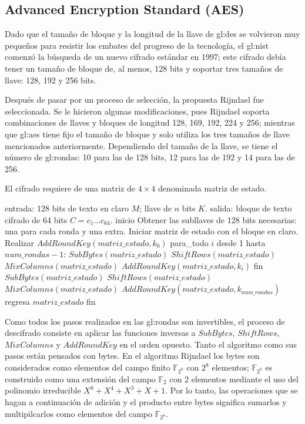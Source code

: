 %
%

\subsection{Advanced Encryption Standard (AES)}
\label{sec:aes}

Dado que el tamaño de bloque y la longitud de la llave de \acrshort{gl:des}
se volvieron muy pequeños para resistir los embates del progreso
de la tecnología, el \acrshort{gl:nist} comenzó la búsqueda de un nuevo cifrado
estándar en 1997; este cifrado debía tener un tamaño de bloque de,
al menos, 128 bits y soportar tres tamaños de llave: 128, 192 y 256 bits.

Después de pasar por un proceso de selección, la propuesta Rijndael fue
seleccionada. Se le hicieron algunas modificaciones, pues Rijndael soporta
combinaciones de llaves y bloques de longitud 128, 169, 192, 224 y 256;
mientras que \acrshort{gl:aes} tiene fijo el tamaño de bloque y solo utiliza
los tres tamaños de llave mencionados anteriormente. Dependiendo del tamaño
de la llave, se tiene el número de \glspl{gl:ronda}: 10 para las de 128 bits,
12 para las de 192 y 14 para las de 256.

El cifrado requiere de una matriz de $4 \times 4$ denominada matriz de
estado.

\begin{pseudocodigo}[caption={AES, cifrado.}, label={aes:1}]
  entrada:    128 bits de texto en claro $M$; llave de $n$ bits $K$.
  salida:     bloque de texto cifrado de 64 bits $C = c_1 \dots c_{64}$.
  inicio
    Obtener las subllaves de 128 bits necesarias: una para cada ronda y una extra.
    Iniciar matriz de estado con el bloque en claro.
    Realizar $AddRoundKey(matriz\_estado, k_0)$
    para_todo $i$ desde 1 hasta $num\_rondas-1$:
      $SubBytes(matriz\_estado)$
      $ShiftRows(matriz\_estado)$
      $MixColumns(matriz\_estado)$
      $AddRoundKey(matriz\_estado, k_i)$
    fin
    $SubBytes(matriz\_estado)$
    $ShiftRows(matriz\_estado)$
    $MixColumns(matriz\_estado)$
    $AddRoundKey(matriz\_estado, k_{num\_rondas})$
    regresa $matriz\_estado$
  fin
\end{pseudocodigo}

Como todos los pasos realizados en las \glspl{gl:ronda} son invertibles, el
proceso de descifrado consiste en aplicar las funciones inversas a
$SubBytes$, $ShiftRows$, $MixColumns$ y $AddRoundKey$ en el orden
opuesto. Tanto el algoritmo como sus pasos están pensados con bytes. 
En el algoritmo Rijndael los bytes son considerados como elementos del
campo finito $\mathbb{F}_{2^8}$ con ${2^8}$ elementos; $\mathbb{F}_{2^8}$
es construido como una extensión del campo  $\mathbb{F}_{2}$ con 2 elementos
mediante el uso del polinomio irreducible $X^8+X^4+X^3+X+1$.
Por lo tanto, las operaciones que se hagan a continuación de adición y el
producto entre bytes significa sumarlos y multipilcarlos como elementos del 
campo  $\mathbb{F}_{2^8}$.


